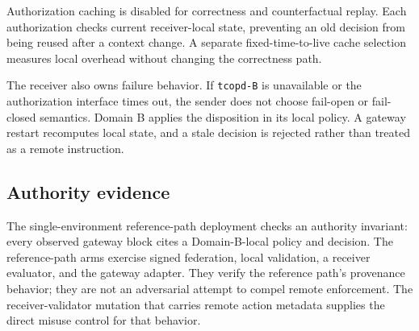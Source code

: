 Authorization caching is disabled for correctness and counterfactual replay. Each authorization checks current receiver-local state, preventing an old decision from being reused after a context change. A separate fixed-time-to-live cache selection measures local overhead without changing the correctness path.

The receiver also owns failure behavior. If \texttt{tcopd-B} is unavailable or the authorization interface times out, the sender does not choose fail-open or fail-closed semantics. Domain B applies the disposition in its local policy. A gateway restart recomputes local state, and a stale decision is rejected rather than treated as a remote instruction.

\subsection{Authority evidence}

The single-environment reference-path deployment checks an authority invariant: every observed gateway block cites a Domain-B-local policy and decision. The \PhysicalArms{} reference-path arms exercise signed federation, local validation, a receiver evaluator, and the gateway adapter. They verify the reference path's provenance behavior; they are not an adversarial attempt to compel remote enforcement. The receiver-validator mutation that carries remote action metadata supplies the direct misuse control for that behavior.
